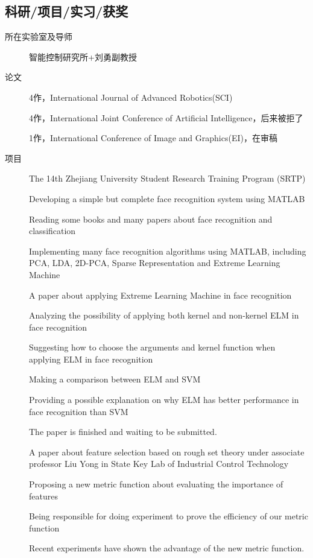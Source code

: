 \documentclass[11pt,fleqn,openany]{book} %
\begin{document}
\subsection*{科研/项目/实习/获奖}
\begin{description}
\item[所在实验室及导师] 智能控制研究所+刘勇副教授
\item[论文] 4作，International Journal of Advanced Robotics(SCI)

4作，International Joint Conference of Artificial Intelligence，后来被拒了

1作，International Conference of Image and Graphics(EI)，在审稿
\item[项目] The 14th Zhejiang University Student Research Training Program (SRTP)



  Developing a simple but complete face recognition system using MATLAB 

  Reading some books and many papers about face recognition and classification

  Implementing many face recognition algorithms using MATLAB, including PCA, LDA, 2D-PCA, Sparse Representation and Extreme Learning Machine



A paper about applying Extreme Learning Machine in face recognition



  Analyzing the possibility of applying both kernel and non-kernel ELM in face recognition

  Suggesting how to choose the arguments and kernel function when applying ELM in face recognition

  Making a comparison between ELM and SVM

  Providing a possible explanation on why ELM has better performance in face recognition than SVM

  The paper is finished and waiting to be submitted.



A paper about feature selection based on rough set theory under associate professor Liu Yong in State Key Lab of Industrial Control Technology



  Proposing a new metric function about evaluating the importance of features

  Being responsible for doing experiment to prove the efficiency of our metric function

  Recent experiments have shown the advantage of the new metric function.


\end{description}
\end{document}
